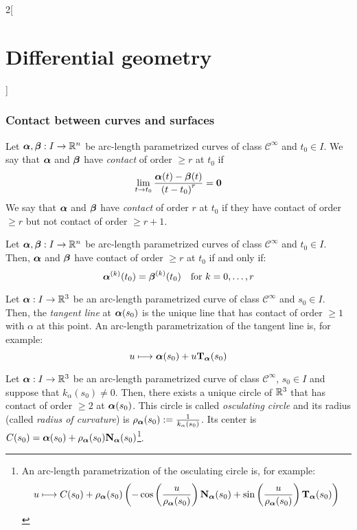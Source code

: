 \documentclass[../../../main.tex]{subfiles}
\begin{document}
\begin{multicols}{2}[\section{Differential geometry}]
  \subsubsection{Contact between curves and surfaces}
  \begin{definition}
    Let $\boldsymbol{\mathrm{\alpha}},\boldsymbol{\mathrm{\beta}}:I\rightarrow\mathbb{R}^n$ be arc-length parametrized curves of class $\mathcal{C}^\infty$ and $t_0\in I$. We say that $\boldsymbol{\mathrm{\alpha}}$ and $\boldsymbol{\mathrm{\beta}}$ have \emph{contact} of order $\geq r$ at $t_0$ if $$\lim_{t\to t_0}\frac{\boldsymbol{\mathrm{\alpha}}(t)-\boldsymbol{\mathrm{\beta}}(t)}{{(t-t_0)}^r}=\boldsymbol{\mathrm{0}}$$
    We say that $\boldsymbol{\mathrm{\alpha}}$ and $\boldsymbol{\mathrm{\beta}}$ have \emph{contact} of order $r$ at $t_0$ if they have contact of order $\geq r$ but not contact of order $\geq r+1$.
  \end{definition}
  \begin{proposition}
    Let $\boldsymbol{\mathrm{\alpha}},\boldsymbol{\mathrm{\beta}}:I\rightarrow\mathbb{R}^n$ be arc-length parametrized curves of class $\mathcal{C}^\infty$ and $t_0\in I$. Then, $\boldsymbol{\mathrm{\alpha}}$ and $\boldsymbol{\mathrm{\beta}}$ have contact of order $\geq r$ at $t_0$ if and only if: $$\boldsymbol{\mathrm{\alpha}}^{(k)}(t_0)=\boldsymbol{\mathrm{\beta}}^{(k)}(t_0)\quad\text{for }k=0,\ldots,r$$
  \end{proposition}
  \begin{proposition}
    Let $\boldsymbol{\mathrm{\alpha}}:I\rightarrow\mathbb{R}^3$ be an arc-length parametrized curve of class $\mathcal{C}^\infty$ and $s_0\in I$. Then, the \emph{tangent line} at $\boldsymbol{\mathrm{\alpha}}(s_0)$ is the unique line that has contact of order $\geq 1$ with $\alpha$ at this point. An arc-length parametrization of the tangent line is, for example: $$u\longmapsto \boldsymbol{\mathrm{\alpha}}(s_0)+u{\boldsymbol{\mathrm{T}}_{\boldsymbol{\mathrm{\alpha}}}}(s_0)$$
  \end{proposition}
  \begin{proposition}
    Let $\boldsymbol{\mathrm{\alpha}}:I\rightarrow\mathbb{R}^3$ be an arc-length parametrized curve of class $\mathcal{C}^\infty$, $s_0\in I$ and suppose that $k_\alpha(s_0)\ne 0$. Then, there exists a unique circle of $\mathbb{R}^3$ that has contact of order $\geq 2$ at $\boldsymbol{\mathrm{\alpha}}(s_0)$. This circle is called \emph{osculating circle} and its radius (called \emph{radius of curvature}) is $\rho_{\boldsymbol{\mathrm{\alpha}}}(s_0):=\frac{1}{k_\alpha(s_0)}$. Its center is $C(s_0)=\boldsymbol{\mathrm{\alpha}}(s_0)+\rho_{\boldsymbol{\mathrm{\alpha}}}(s_0){\boldsymbol{\mathrm{N}}_{\boldsymbol{\mathrm{\alpha}}}}(s_0)$\footnote{An arc-length parametrization of the osculating circle is, for example: $$u\longmapsto C(s_0)+\rho_{\boldsymbol{\mathrm{\alpha}}}(s_0)\left(-\cos\left(\frac{u}{\rho_{\boldsymbol{\mathrm{\alpha}}}(s_0)}\right){\boldsymbol{\mathrm{N}}_{\boldsymbol{\mathrm{\alpha}}}}(s_0)+\sin\left(\frac{u}{\rho_{\boldsymbol{\mathrm{\alpha}}}(s_0)}\right){\boldsymbol{\mathrm{T}}_{\boldsymbol{\mathrm{\alpha}}}}(s_0)\right)$$}.
  \end{proposition}
  \begin{proposition}

\end{proposition}
\end{multicols}
\end{document}
